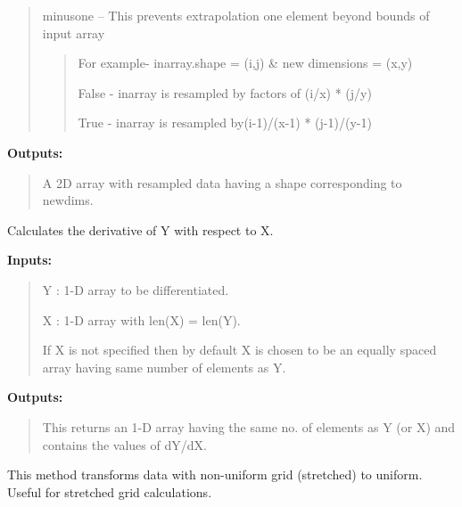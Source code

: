 \documentclass[letterpaper,10pt,english]{sphinxmanual}
\begin{document}
\begin{fulllineitems}
\begin{fulllineitems}
\begin{quote}
minusone -- This prevents extrapolation one element beyond bounds of input array
\begin{quote}

For example- inarray.shape = (i,j) \& new dimensions = (x,y)

False - inarray is resampled by factors of (i/x) * (j/y)

True - inarray is resampled by(i-1)/(x-1) * (j-1)/(y-1)
\end{quote}
\end{quote}

\textbf{Outputs:}
\begin{quote}

A 2D array with resampled data having a shape corresponding to newdims.
\end{quote}

\end{fulllineitems}


\begin{fulllineitems}
\label{tools:pyPLUTO.Tools.deriv}
Calculates the derivative of Y with respect to X.

\textbf{Inputs:}
\begin{quote}

Y : 1-D array to be differentiated.

X : 1-D array with len(X) = len(Y).

If X is not specified then by default X is chosen to be an equally spaced array having same number of elements
as Y.
\end{quote}

\textbf{Outputs:}
\begin{quote}

This returns an 1-D array having the same no. of elements as Y (or X) and contains the values of dY/dX.
\end{quote}

\end{fulllineitems}


\begin{fulllineitems}
\label{tools:pyPLUTO.Tools.getUniformGrid}
This method transforms data with non-uniform grid (stretched) to uniform. Useful for stretched grid calculations.


\end{fulllineitems}
\end{fulllineitems}
\end{document}
